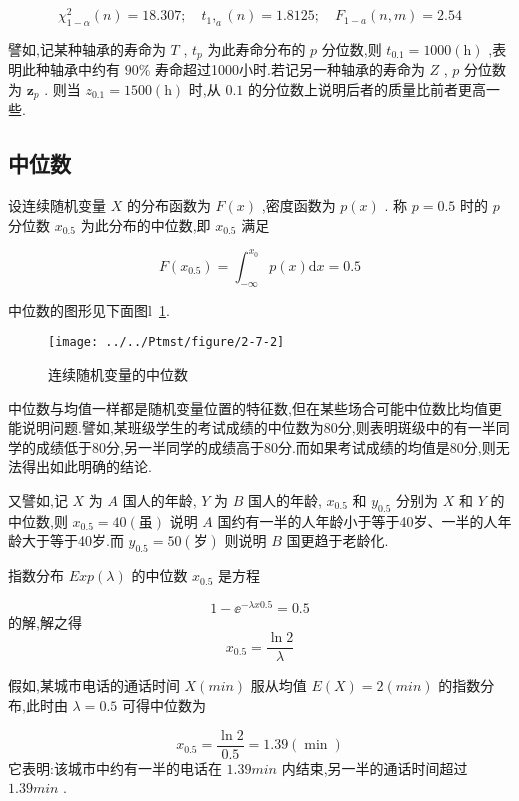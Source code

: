 \[
\chi_{1-\alpha}^{2}(n)=18.307 ; \quad t_{1},_{a}(n)=1.8125 ; \quad F_{1-a}(n, m)=2.54
\]

譬如,记某种轴承的寿命为 $ T $ , $ t_{p} $ 为此寿命分布的 $ p $ 分位数,则 $ t_{0.1}=1000 (\mathrm{h}) $ ,表明此种轴承中约有 $ 90\% $ 寿命超过1000小时.若记另一种轴承的寿命为 $ Z $ , $ p $ 分位数为 $ \boldsymbol{z}_{p} $ . 则当 $ z_{0.1}=1500(\mathrm{h}) $ 时,从 $ 0.1 $ 的分位数上说明后者的质量比前者更高一些.

\subsection{中位数}

\begin{definition}{}{}
	设连续随机变量 $ X $ 的分布函数为 $ F(x) $ ,密度函数为 $ p(x) $ .
	称 $ p=0.5 $ 时的 $ p $ 分位数 $ x_{0.5} $ 为此分布的中位数,即 $ x_{0.5} $ 满足
	
	\begin{equation}
	F\left(x_{0.5}\right)=\int_{-\infty}^{x_{0}} p(x) \mathrm{d} x=0.5 \label{eq:2.7.8}
	\end{equation}
	
\end{definition}

中位数的图形见下面图l~\ref{fig:2-7-2}.

\begin{figure}
	\centering
	\texttt{[image: ../../Ptmst/figure/2-7-2]}
	\caption{连续随机变量的中位数}
	\label{fig:2-7-2}
\end{figure}

中位数与均值一样都是随机变量位置的特征数,但在某些场合可能中位数比均值更能说明问题.譬如,某班级学生的考试成绩的中位数为80分,则表明斑级中的有一半同学的成绩低于80分,另一半同学的成绩高于80分.而如果考试成绩的均值是80分,则无法得出如此明确的结论.

又譬如,记 $ X $ 为 $ A $ 国人的年龄, $ Y $ 为 $ B $ 国人的年龄, $ x_{0.5} $ 和 $ y_{0.5} $ 分别为 $ X $ 和 $ Y $ 的中位数,则 $ x_{0.5}=40(\text{虽}) $ 说明 $ A $ 国约有一半的人年龄小于等于40岁、一半的人年龄大于等于40岁.而 $ y_{0.5}=50(\text{岁}) $ 则说明 $ B $ 国更趋于老龄化.

\begin{example}
	指数分布 $ E x p(\lambda) $ 的中位数 $ x_{0.5} $ 是方程
	
	\[
	1-\ee ^{-\lambda x 0.5}=0.5
	\]
	的解,解之得
	\[
	x_{0.5}=\frac{\ln 2}{\lambda}
	\]
	
	假如,某城市电话的通话时间 $ X(min) $ 服从均值 $ E(X)=2(min) $ 的指数分布,此时由 $ \lambda=0.5 $ 可得中位数为
	
	\[
	x_{0.5}=\frac{\ln 2}{0.5}=1.39(\min )
	\]
	它表明:该城市中约有一半的电话在 $ 1.39min $ 内结束,另一半的通话时间超过 $ 1.39 min $ .
\end{example}

